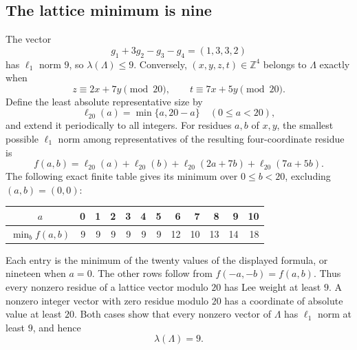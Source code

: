 \documentclass[11pt,letterpaper]{article}
\numberwithin{equation}{section}
\theoremstyle{definition}
\theoremstyle{remark}
\newcommand{\Z}{\mathbb Z}
\begin{document}
\subsection{The lattice minimum is nine}
The vector
\[
 g_1+3g_2-g_3-g_4=(1,3,3,2)
\]
has $\ell_1$ norm $9$, so $\lambda(\Lambda)\le9$. Conversely, $(x,y,z,t)\in\Z^4$ belongs to $\Lambda$ exactly when
\[
 z\equiv2x+7y\pmod{20},\qquad
 t\equiv7x+5y\pmod{20}.
\]
Define the least absolute representative size by
\[
 \ell_{20}(a)=\min\{a,20-a\}\quad(0\le a<20),
\]
and extend it periodically to all integers. For residues $a,b$ of $x,y$, the smallest possible $\ell_1$ norm among representatives of the resulting four-coordinate residue is
\[
 f(a,b)=\ell_{20}(a)+\ell_{20}(b)
       +\ell_{20}(2a+7b)+\ell_{20}(7a+5b).
\]
The following exact finite table gives its minimum over $0\le b<20$, excluding $(a,b)=(0,0)$:
\begin{center}
\setlength{\tabcolsep}{5pt}
\begin{tabular}{c|rrrrrrrrrrr}
\toprule
$a$&0&1&2&3&4&5&6&7&8&9&10\\
\midrule
$\min_b f(a,b)$&9&9&9&9&9&9&12&10&13&14&18\\
\bottomrule
\end{tabular}
\end{center}
Each entry is the minimum of the twenty values of the displayed formula, or nineteen when $a=0$. The other rows follow from $f(-a,-b)=f(a,b)$. Thus every nonzero residue of a lattice vector modulo $20$ has Lee weight at least $9$. A nonzero integer vector with zero residue modulo $20$ has a coordinate of absolute value at least $20$. Both cases show that every nonzero vector of $\Lambda$ has $\ell_1$ norm at least $9$, and hence
\begin{equation}\label{eq:counter-minimum}
 \lambda(\Lambda)=9.
\end{equation}
\end{document}
